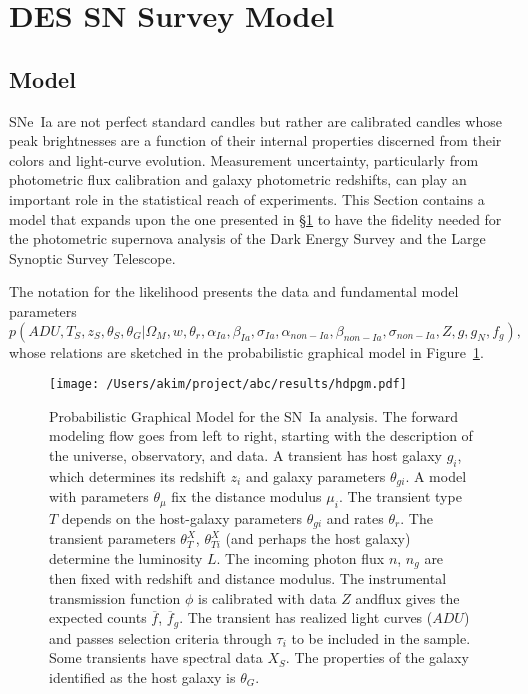 \documentclass[preprint,3p]{elsarticle}
\begin{document}
\section{DES SN Survey Model}
\label{snIamodel:sec}
\subsection{Model}
SNe~Ia are not perfect standard candles but rather are calibrated candles whose
peak brightnesses are a
function of their internal properties discerned from their colors and light-curve evolution.
Measurement uncertainty, particularly from photometric flux
calibration and galaxy photometric redshifts, can play an important role in the statistical
reach of experiments.  This Section contains a model that expands upon the one
presented in \S\ref{snIamodel:sec} to have the fidelity needed for the photometric
supernova analysis of the Dark Energy Survey and the Large Synoptic Survey Telescope.

The notation for the likelihood presents the data and fundamental model parameters
\begin{equation}
p(\mathit{ADU}, {{T}}_S,{{z}}_S, \theta_{S}, \theta_G |  \Omega_M, w, \theta_r, \alpha_{Ia}, \beta_{Ia},\sigma_{Ia}, \alpha_{\mathit{non-Ia}},\beta_{\mathit{non-Ia}}, \sigma_{\mathit{non-Ia}},  Z, g, g_N, f_g),
\label{likelihood2:eqn}
\end{equation}
whose relations are sketched in the probabilistic graphical model in Figure~\ref{pgm:fig}.

\begin{figure}[htbp] %
   \centering
   \texttt{[image: /Users/akim/project/abc/results/hdpgm.pdf]} 
   \caption{Probabilistic Graphical Model for the SN~Ia analysis.  
   The forward modeling
   flow goes from left to right, starting with the description of the universe, observatory,
   and data.    A transient has host galaxy $g_i$, which determines its redshift $z_i$
   and galaxy parameters $\theta_{gi}$.
   A model with parameters $\theta_\mu$ fix the distance modulus $\mu_i$.
   The transient type $T$ depends on the host-galaxy parameters  $\theta_{gi}$
   and rates $\theta_r$.   The transient
   parameters $\theta_T^X$, $\theta_{Ti}^X$ (and perhaps the host galaxy) determine the luminosity $L$.       The 
   incoming photon flux $n$, $n_g$  are then fixed
   with redshift and distance modulus.
   The instrumental transmission function $\phi$ is calibrated with data ${Z}$ andflux
   gives the expected
   counts $\overline{f}$, $\overline{f}_g$. 
   The transient has realized light curves (${ADU}$) and passes selection criteria
   through $\tau_i$ to be included in the sample.  Some transients have spectral data
   ${X}_S$.  The properties of the galaxy identified as the host galaxy is $\theta_G$. 
   \label{pgm:fig}}
\end{figure}
\end{document}
